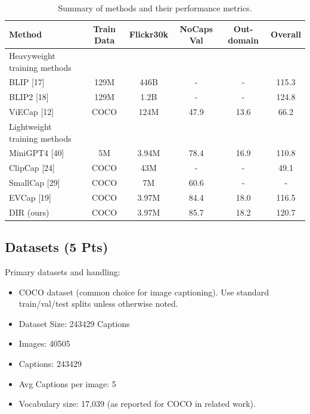 \documentclass[11pt]{article}
\begin{document}
\begin{table}[t]
  \centering
  \begin{tabular}{|l|c|c|c|c|c|}
    \hline
    Method                       & Train Data & Flickr30k & NoCaps Val & Out-domain & Overall \\
    \hline
    Heavyweight training methods &            &           &            &            &         \\
    BLIP [17]                    & 129M       & 446B      & -          & -          & 115.3   \\
    BLIP2 [18]                   & 129M       & 1.2B      & -          & -          & 124.8   \\
    ViECap [12]                  & COCO       & 124M      & 47.9       & 13.6       & 66.2    \\
    \hline
    Lightweight training methods &            &           &            &            &         \\
    MiniGPT4 [40]                & 5M         & 3.94M     & 78.4       & 16.9       & 110.8   \\
    ClipCap [24]                 & COCO       & 43M       & -          & -          & 49.1    \\
    SmallCap [29]                & COCO       & 7M        & 60.6       & -          & -       \\
    EVCap [19]                   & COCO       & 3.97M     & 84.4       & 18.0       & 116.5   \\
    DIR (ours)                   & COCO       & 3.97M     & 85.7       & 18.2       & 120.7   \\
    \hline
  \end{tabular}
  \caption{Summary of methods and their performance metrics.}
  \label{tab:methods_performance}
\end{table}

\subsection{Datasets (5 Pts)}
Primary datasets and handling:
\begin{itemize}
  \item COCO dataset (common choice for image captioning). Use standard train/val/test splits unless otherwise noted.
  \item Dataset Size: 243429 Captions
  \item Images: 40505
  \item Captions: 243429
  \item Avg Captions per image: 5
  \item Vocabulary size: 17,039 (as reported for COCO in related work).
\end{itemize}
\end{document}
